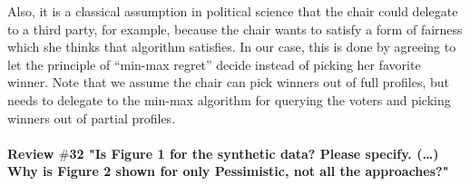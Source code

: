 \documentclass{article}
\newcommand{\commentOC}[1]{\textcolor{blue}{\small$\big[$OC: #1$\big]$}}
\newcommand{\commentBN}[1]{\textcolor{magenta}{\small$\big[$BN: #1$\big]$}}
\begin{document}
Also, it is a classical assumption in political science that the chair could delegate to a third party, for example, because the chair wants to satisfy a form of fairness which she thinks that algorithm satisfies. In our case, this is done by agreeing to let the principle of “min-max regret” decide instead of picking her favorite winner. Note that we assume the chair can pick winners out of full profiles, but needs to delegate to the min-max algorithm for querying the voters and picking winners out of partial profiles.



\paragraph{Review $\#$32 "Is Figure 1 for the synthetic data? Please specify. (…) Why is Figure 2 shown for only Pessimistic, not all the approaches?"}

%
\end{document}
